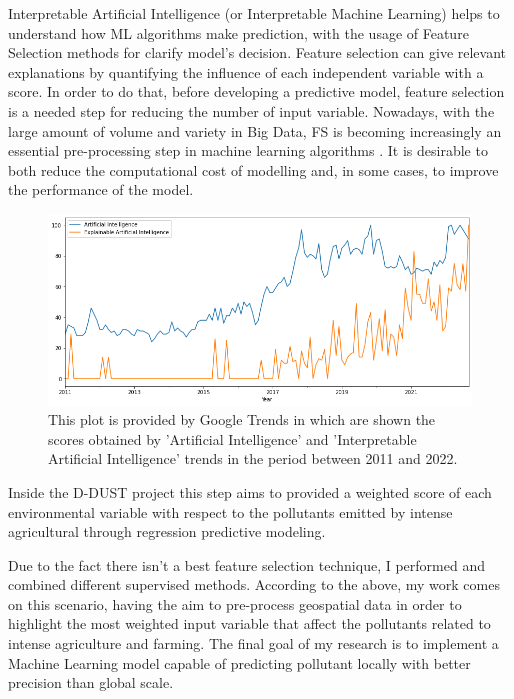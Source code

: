 Interpretable Artificial Intelligence (or Interpretable Machine Learning) helps to understand how ML algorithms make prediction, with the usage of Feature Selection methods for clarify model’s decision.
Feature selection can give relevant explanations by quantifying the influence of each independent variable with a score.
In order to do that, before developing a predictive model, feature selection is a needed step for reducing the number of input variable. \newline
Nowadays, with the large amount of volume and variety in Big Data, FS is becoming increasingly an essential pre-processing step in machine learning algorithms \cite{kamolov2021feature}.
It is desirable to both reduce the computational cost of modelling and, in some cases, to improve the performance of the model.\newline
\begin{figure}[H]
    \includegraphics[scale=0.50]{images/AI_XAI.png}
    \caption{This plot is provided by Google Trends in which are shown the scores obtained by 'Artificial Intelligence' and 'Interpretable Artificial Intelligence' trends in the period between 2011 and 2022.}
    \label{fig:AI_XAI}
\end{figure}
\bigbreak
Inside the D-DUST project this step aims to provided a weighted score of each environmental variable with respect to the pollutants emitted by intense agricultural through regression predictive modeling.\newline
\par
Due to the fact there isn’t a best feature selection technique, I performed and combined different supervised methods. 
\bigbreak
According to the above, my work comes on this scenario, having the aim to pre-process geospatial data in order to highlight the most weighted input variable that affect the pollutants related to intense agriculture and farming.\newline
The final goal of my research is to implement a Machine Learning model capable of predicting pollutant locally with better precision than global scale. 





